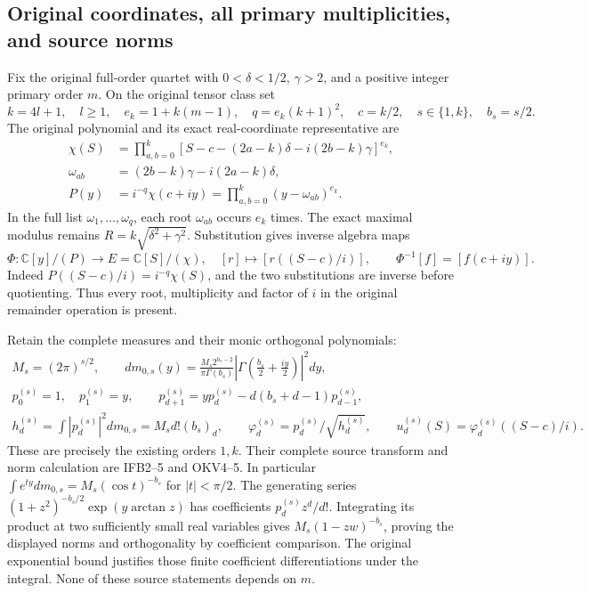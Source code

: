 \documentclass[11pt,a4paper]{article}
\begin{document}
\subsection{Original coordinates, all primary multiplicities, and source norms}
Fix the original full-order quartet with $0<\delta<1/2$, $\gamma>2$,
and a positive integer primary order $m$. On the original tensor class set
\[
 k=4l+1,\quad l\ge1,\quad e_k=1+k(m-1),\quad
 q=e_k(k+1)^2,\quad c=k/2,\quad s\in\{1,k\},\quad b_s=s/2.
 \tag{KAF1}
\]
The original polynomial and its exact real-coordinate representative are
\[
\begin{split}
 \chi(S)&=\prod_{a,b=0}^k
 [S-c-(2a-k)\delta-i(2b-k)\gamma]^{e_k},\\
 \omega_{ab}&=(2b-k)\gamma-i(2a-k)\delta,\\
 P(y)&=i^{-q}\chi(c+iy)
       =\prod_{a,b=0}^k(y-\omega_{ab})^{e_k}.
\end{split}\tag{KAF2}
\]
In the full list $\omega_1,\ldots,\omega_q$, each root $\omega_{ab}$
occurs $e_k$ times. The exact maximal modulus remains
$R=k\sqrt{\delta^2+\gamma^2}$. Substitution gives inverse algebra maps
\[
 \Phi:\mathbb C[y]/(P)\longrightarrow E=\mathbb C[S]/(\chi),
 \quad[r]\longmapsto[r((S-c)/i)],\qquad
 \Phi^{-1}[f]=[f(c+iy)].\tag{KAF3}
\]
Indeed $P((S-c)/i)=i^{-q}\chi(S)$, and the two substitutions are
inverse before quotienting. Thus every root, multiplicity and factor of
$i$ in the original remainder operation is present.

Retain the complete measures and their monic orthogonal polynomials:
\[
\begin{gathered}
 M_s=(2\pi)^{s/2},\qquad
 dm_{0,s}(y)=\frac{M_s2^{b_s-2}}{\pi\Gamma(b_s)}
       \left|\Gamma\left(\frac{b_s}{2}+\frac{iy}{2}\right)\right|^2dy,\\
 p_0^{(s)}=1,\quad p_1^{(s)}=y,\qquad
 p_{d+1}^{(s)}=yp_d^{(s)}-d(b_s+d-1)p_{d-1}^{(s)},\\
 h_d^{(s)}=\int|p_d^{(s)}|^2dm_{0,s}=M_s d!(b_s)_d,\qquad
 \varphi_d^{(s)}=p_d^{(s)}/\sqrt{h_d^{(s)}},\qquad
 u_d^{(s)}(S)=\varphi_d^{(s)}((S-c)/i).
\end{gathered}\tag{KAF4}
\]
These are precisely the existing orders $1,k$. Their complete source
transform and norm calculation are IFB2--5 and OKV4--5. In particular
$\int e^{ty}dm_{0,s}=M_s(\cos t)^{-b_s}$ for $|t|<\pi/2$.
The generating series
$(1+z^2)^{-b_s/2}\exp(y\arctan z)$ has coefficients
$p_d^{(s)}z^d/d!$. Integrating its product at two sufficiently small
real variables gives $M_s(1-zw)^{-b_s}$, proving the displayed norms
and orthogonality by coefficient comparison. The original exponential
bound justifies those finite coefficient differentiations under the
integral. None of these source statements depends on $m$.
\end{document}
